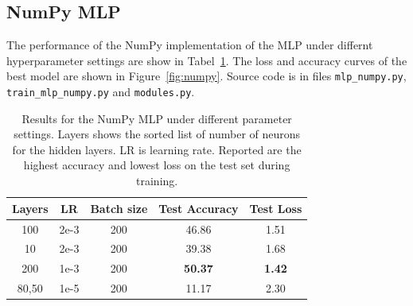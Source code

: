 \documentclass{article}
\newcommand\·{\ensuremath{\cdot}}
\newcommand\…{\ensuremath{\dots}}
\newcommand{\⇔}{\ensuremath{\iff}}
\newcommand{\⇐}{\ensuremath{\impliedby}}
\newcommand{\⇒}{\ensuremath{\implies}}
\newcommand\1{\ensuremath{\mathds{1}}}
\newcommand\ℝ{\ensuremath{\mathds{R}}}
\begin{document}
\subsection{NumPy MLP}
The performance of the NumPy implementation of the MLP under differnt hyperparameter settings are show in Tabel~\ref{tab:numpy}.
The loss and accuracy curves of the best model are shown in Figure~\ref{fig:numpy}.
Source code is in files \texttt{mlp\_numpy.py}, \texttt{train\_mlp\_numpy.py} and \texttt{modules.py}.

\begin{table}
  \centering
  \begin{tabular}{ccccc}
    Layers & LR & Batch size & Test Accuracy & Test Loss\\\toprule
    100 & 2e-3 & 200 & 46.86 & 1.51\\
    10 & 2e-3 & 200 & 39.38 & 1.68\\
    200 & 1e-3 & 200 & \textbf{50.37} & \textbf{1.42}\\
    80,50 & 1e-5 & 200 & 11.17 & 2.30\\
  \end{tabular}
  \caption{Results for the NumPy MLP under different parameter settings. Layers shows the sorted list of number of neurons for the hidden layers. LR is learning rate. Reported are the highest accuracy and lowest loss on the test set during training.}
  \label{tab:numpy}
\end{table}
\end{document}
